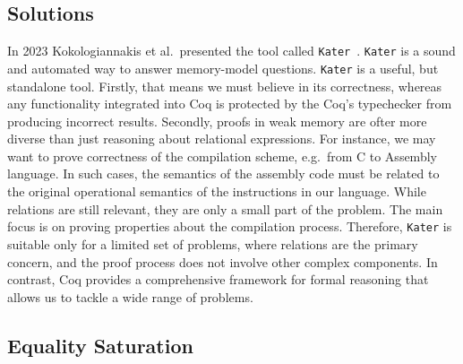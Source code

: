 \subsection{Solutions}
In 2023 Kokologiannakis et al.\ presented the tool called \texttt{Kater}~\cite{kater}. \texttt{Kater} is a sound and automated way to answer memory-model questions. \texttt{Kater} is a useful, but standalone tool. Firstly, that means we must believe in its correctness, whereas any functionality integrated into Coq is protected by the Coq's typechecker from producing incorrect results. Secondly, proofs in weak memory are ofter more diverse than just reasoning about relational expressions. For instance, we may want to prove correctness of the compilation scheme, e.g.\ from C to Assembly language. In such cases, the semantics of the assembly code must be related to the original operational semantics of the instructions in our language. While relations are still relevant, they are only a small part of the problem. The main focus is on proving properties about the compilation process. Therefore, \texttt{Kater} is suitable only for a limited set of problems, where relations are the primary concern, and the proof process does not involve other complex components. In contrast, Coq provides a comprehensive framework for formal reasoning that allows us to tackle a wide range of problems. 

\subsection{Equality Saturation}